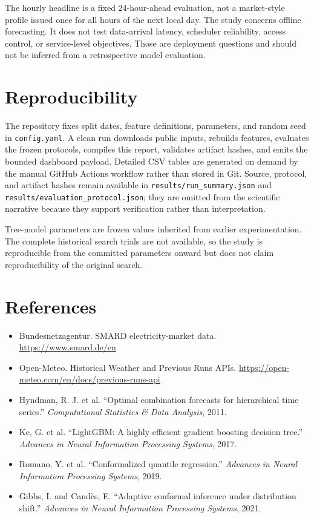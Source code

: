 \documentclass[10.5pt,a4paper]{article}
\begin{document}
The hourly headline is a fixed 24-hour-ahead evaluation, not a market-style profile issued once for
all hours of the next local day. The study concerns offline forecasting. It does not test data-arrival latency, scheduler
reliability, access control, or service-level objectives. Those are deployment questions and should
not be inferred from a retrospective model evaluation.

\section{Reproducibility}

The repository fixes split dates, feature definitions, parameters, and random seed in
\texttt{config.yaml}. A clean run downloads public inputs, rebuilds features, evaluates the frozen
protocols, compiles this report, validates artifact hashes, and emits the bounded dashboard payload.
Detailed CSV tables are generated on demand by the manual GitHub Actions workflow rather than stored
in Git. Source, protocol, and artifact hashes remain available in
\texttt{results/run\_summary.json} and \texttt{results/evaluation\_protocol.json}; they are omitted
from the scientific narrative because they support verification rather than interpretation.

Tree-model parameters are frozen values inherited from earlier experimentation. The complete
historical search trials are not available, so the study is reproducible from the committed
parameters onward but does not claim reproducibility of the original search.

\section*{References}

\begin{itemize}
\footnotesize
  \item Bundesnetzagentur. SMARD electricity-market data. \url{https://www.smard.de/en}
  \item Open-Meteo. Historical Weather and Previous Runs APIs. \url{https://open-meteo.com/en/docs/previous-runs-api}
  \item Hyndman, R. J. et al. ``Optimal combination forecasts for hierarchical time series.'' \emph{Computational Statistics \& Data Analysis}, 2011.
  \item Ke, G. et al. ``LightGBM: A highly efficient gradient boosting decision tree.'' \emph{Advances in Neural Information Processing Systems}, 2017.
  \item Romano, Y. et al. ``Conformalized quantile regression.'' \emph{Advances in Neural Information Processing Systems}, 2019.
  \item Gibbs, I. and Candès, E. ``Adaptive conformal inference under distribution shift.'' \emph{Advances in Neural Information Processing Systems}, 2021.
\end{itemize}
\end{document}
